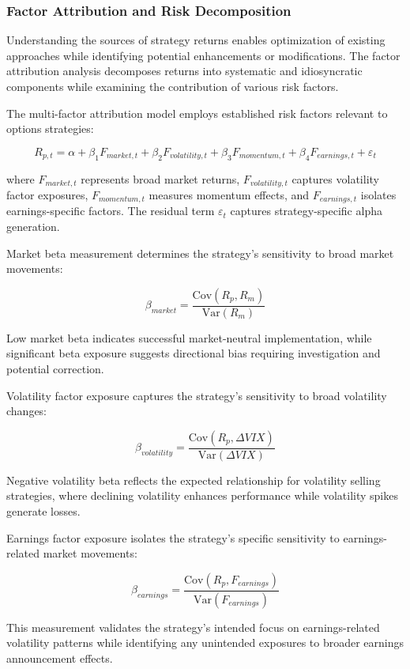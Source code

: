 \documentclass[
  american,
  11pt,
  11pt,
  letterpaper,
  onecolumn]{article}
\begin{document}
\subsubsection{Factor Attribution and Risk
Decomposition}\label{factor-attribution-and-risk-decomposition}

Understanding the sources of strategy returns enables optimization of
existing approaches while identifying potential enhancements or
modifications. The factor attribution analysis decomposes returns into
systematic and idiosyncratic components while examining the contribution
of various risk factors.

The multi-factor attribution model employs established risk factors
relevant to options strategies:

\[R_{p,t} = \alpha + \beta_1 F_{market,t} + \beta_2 F_{volatility,t} + \beta_3 F_{momentum,t} + \beta_4 F_{earnings,t} + \varepsilon_t\]

where \(F_{market,t}\) represents broad market returns,
\(F_{volatility,t}\) captures volatility factor exposures,
\(F_{momentum,t}\) measures momentum effects, and \(F_{earnings,t}\)
isolates earnings-specific factors. The residual term \(\varepsilon_t\)
captures strategy-specific alpha generation.

Market beta measurement determines the strategy's sensitivity to broad
market movements:

\[\beta_{market} = \frac{\text{Cov}(R_p, R_m)}{\text{Var}(R_m)}\]

Low market beta indicates successful market-neutral implementation,
while significant beta exposure suggests directional bias requiring
investigation and potential correction.

Volatility factor exposure captures the strategy's sensitivity to broad
volatility changes:

\[\beta_{volatility} = \frac{\text{Cov}(R_p, \Delta VIX)}{\text{Var}(\Delta VIX)}\]

Negative volatility beta reflects the expected relationship for
volatility selling strategies, where declining volatility enhances
performance while volatility spikes generate losses.

Earnings factor exposure isolates the strategy's specific sensitivity to
earnings-related market movements:

\[\beta_{earnings} = \frac{\text{Cov}(R_p, F_{earnings})}{\text{Var}(F_{earnings})}\]

This measurement validates the strategy's intended focus on
earnings-related volatility patterns while identifying any unintended
exposures to broader earnings announcement effects.
\end{document}
